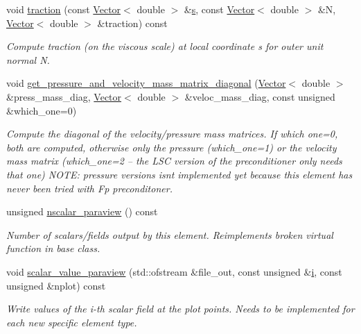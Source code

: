 \begin{DoxyCompactItemize}
void \hyperlink{classoomph_1_1GeneralisedNewtonianAxisymmetricNavierStokesEquations_a8df8becab07205931682772c05d1de1c}{traction} (const \hyperlink{classoomph_1_1Vector}{Vector}$<$ double $>$ \&\hyperlink{cfortran_8h_ab7123126e4885ef647dd9c6e3807a21c}{s}, const \hyperlink{classoomph_1_1Vector}{Vector}$<$ double $>$ \&N, \hyperlink{classoomph_1_1Vector}{Vector}$<$ double $>$ \&traction) const
\begin{DoxyCompactList}\small\item\em Compute traction (on the viscous scale) at local coordinate s for outer unit normal N. \end{DoxyCompactList}\item 
void \hyperlink{classoomph_1_1GeneralisedNewtonianAxisymmetricNavierStokesEquations_a0c4bd2fe53aee0df4fa9b2bf57fb6a89}{get\+\_\+pressure\+\_\+and\+\_\+velocity\+\_\+mass\+\_\+matrix\+\_\+diagonal} (\hyperlink{classoomph_1_1Vector}{Vector}$<$ double $>$ \&press\+\_\+mass\+\_\+diag, \hyperlink{classoomph_1_1Vector}{Vector}$<$ double $>$ \&veloc\+\_\+mass\+\_\+diag, const unsigned \&which\+\_\+one=0)
\begin{DoxyCompactList}\small\item\em Compute the diagonal of the velocity/pressure mass matrices. If which one=0, both are computed, otherwise only the pressure (which\+\_\+one=1) or the velocity mass matrix (which\+\_\+one=2 -- the L\+SC version of the preconditioner only needs that one) N\+O\+TE\+: pressure versions isn\textquotesingle{}t implemented yet because this element has never been tried with Fp preconditoner. \end{DoxyCompactList}\item 
unsigned \hyperlink{classoomph_1_1GeneralisedNewtonianAxisymmetricNavierStokesEquations_aae82381c018c86ff7abc13dddc7ff0a6}{nscalar\+\_\+paraview} () const
\begin{DoxyCompactList}\small\item\em Number of scalars/fields output by this element. Reimplements broken virtual function in base class. \end{DoxyCompactList}\item 
void \hyperlink{classoomph_1_1GeneralisedNewtonianAxisymmetricNavierStokesEquations_ad5f147e84ac4a3cdd4caf9e96d927661}{scalar\+\_\+value\+\_\+paraview} (std\+::ofstream \&file\+\_\+out, const unsigned \&\hyperlink{cfortran_8h_adb50e893b86b3e55e751a42eab3cba82}{i}, const unsigned \&nplot) const
\begin{DoxyCompactList}\small\item\em Write values of the i-\/th scalar field at the plot points. Needs to be implemented for each new specific element type. \end{DoxyCompactList}\item 

\end{DoxyCompactItemize}
